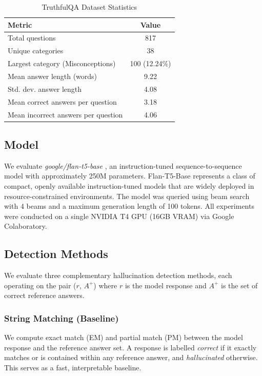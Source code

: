\documentclass[conference]{IEEEtran}
\begin{document}
\begin{table}[h]
\caption{TruthfulQA Dataset Statistics}
\label{tab:dataset_stats}
\centering
\begin{tabular}{lc}
\toprule
\textbf{Metric} & \textbf{Value} \\
\midrule
Total questions & 817 \\
Unique categories & 38 \\
Largest category (Misconceptions) & 100 (12.24\%) \\
Mean answer length (words) & 9.22 \\
Std. dev. answer length & 4.08 \\
Mean correct answers per question & 3.18 \\
Mean incorrect answers per question & 4.06 \\
\bottomrule
\end{tabular}
\end{table}

\subsection{Model}

We evaluate \textit{google/flan-t5-base}
\cite{chung2022scaling}, an instruction-tuned
sequence-to-sequence model with approximately 250M parameters.
Flan-T5-Base represents a class of compact, openly available
instruction-tuned models that are widely deployed in
resource-constrained environments.
The model was queried using beam search with 4 beams and a
maximum generation length of 100 tokens.
All experiments were conducted on a single NVIDIA T4 GPU
(16GB VRAM) via Google Colaboratory.

\subsection{Detection Methods}

We evaluate three complementary hallucination detection
methods, each operating on the pair
($r$, $A^+$) where $r$ is the model response and
$A^+$ is the set of correct reference answers.

\subsubsection{String Matching (Baseline)}
We compute exact match (EM) and partial match (PM) between
the model response and the reference answer set.
A response is labelled \textit{correct} if it exactly matches
or is contained within any reference answer, and
\textit{hallucinated} otherwise.
This serves as a fast, interpretable baseline.
\end{document}
